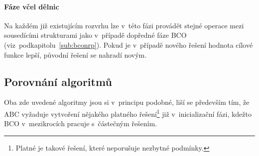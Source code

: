 \documentclass[twoside]{ctuthesis}
\begin{document}
\begin{enumerate}[label=\textbf{O\arabic*.}]
\paragraph{Fáze včel dělnic}
Na každém již existujícím rozvrhu lze v~této fázi provádět stejné operace mezi sousedícími strukturami jako v~případě dopředné fáze BCO (viz~podkapitolu~\ref{sub:bconrp}). Pokud je v~případě nového řešení hodnota cílové funkce lepší, původní řešení se nahradí novým.

\subsection{Porovnání algoritmů}
Oba zde uvedené algoritmy jsou si v~principu podobné, liší se především tím, že ABC vyžaduje vytvoření nějakého platného řešení\footnote{Platné je takové řešení, které neporušuje nezbytné podmínky.} již v~inicializační fázi, kdežto BCO v~mezikrocích pracuje s~částečným řešením.

%
%
%
%


\end{enumerate}
\end{document}
